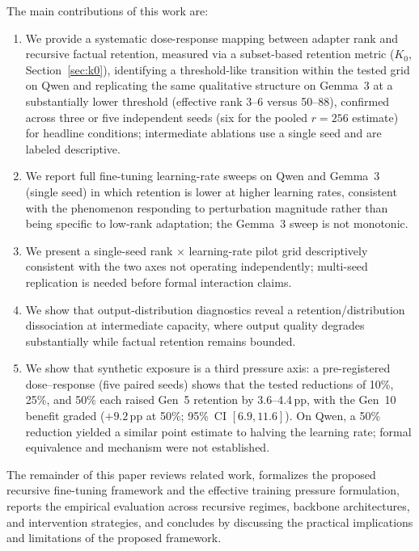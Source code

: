 \documentclass[a4paper,fleqn]{cas-dc}
\newif\ifshowchanges
\newcommand{\rev}[1]{\ifshowchanges{\color{blue}#1}\else{#1}\fi}
\begin{document}
The main contributions of this work are:
\begin{enumerate}
    \item We provide a systematic dose-response mapping between adapter rank and
    recursive factual retention, measured via a subset-based retention metric
    ($K_0$, Section~\ref{sec:k0}), identifying 
\rev{a threshold-like transition within the tested grid} on Qwen
    and replicating the same qualitative structure on Gemma~3 at a
    substantially lower threshold (effective rank 3--6 versus 50--88),
    \rev{confirmed across three or five independent seeds (six for the pooled $r=256$ estimate) for headline conditions; intermediate ablations use a single seed and are labeled descriptive}.
    \item We report full fine-tuning learning-rate sweeps on Qwen and Gemma~3 (single seed) in which retention is lower at higher learning rates, consistent with the phenomenon responding to perturbation magnitude rather than being specific to low-rank adaptation; the Gemma~3 sweep is not monotonic.
    \item \rev{We present a single-seed rank $\times$ learning-rate pilot grid descriptively consistent with the two axes not operating independently; multi-seed replication is needed before formal interaction claims.}
    \item We show that output-distribution diagnostics reveal a
    retention/distribution dissociation at intermediate capacity, where output
    quality degrades substantially while factual retention remains bounded.
    \item We show that synthetic exposure is a third pressure axis: a
    pre-registered dose--response (five paired seeds) shows that \rev{the tested
    reductions of 10\%, 25\%, and 50\%} each raised Gen~5 retention by \rev{3.6--4.4\,pp},
    with the Gen~10 benefit graded (\rev{$+9.2$}\,pp at 50\%; 95\%~CI $[6.9, 11.6]$).
    \rev{On Qwen, a 50\% reduction yielded a similar point estimate to halving the learning rate; formal equivalence and mechanism were not established.}
\end{enumerate}

The remainder of this paper reviews related work, formalizes the proposed
recursive fine-tuning framework and the effective training pressure formulation,
reports the empirical evaluation across recursive regimes, backbone
architectures, and intervention strategies, and concludes by discussing the
practical implications and limitations of the proposed framework.
\end{document}

